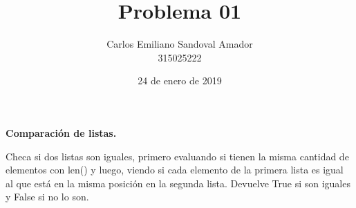 \documentclass[letterpaper, 12pt, oneside]{article}%
\title{Problema 01}
\author{Carlos Emiliano Sandoval Amador \\ 315025222}
\date{24 de enero de 2019}
\begin{document}
	\maketitle
	\begin{center}
		\textbf{\large Comparación de listas.}
	\end{center}
	Checa si dos listas son iguales, primero evaluando si tienen la misma cantidad de elementos con len() y luego, viendo si cada elemento de la primera lista es igual al que está en la misma posición en la segunda lista. Devuelve True si son iguales y False si no lo son.
\end{document}
